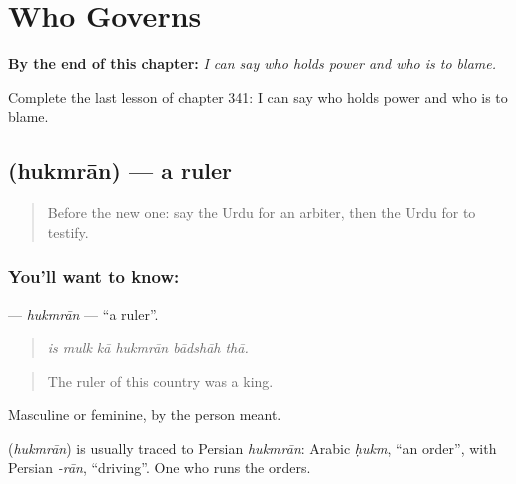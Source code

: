 
\chapter{Who Governs}
\label{ch:ur-who-governs}

\begin{chapteropening}
\textbf{By the end of this chapter:} \emph{I can say who holds power and who is to blame.}

Complete the last lesson of chapter 341: I can say who holds power and who is to blame.
\end{chapteropening}

\section[\texorpdfstring{\ur{حکمران} (hukmrān)}{حکمران (hukmrān)}]{ (hukmrān) — a ruler}

\label{lesson:UR-C341-hukmran}



\begin{quote}
Before the new one: say the Urdu for an arbiter, then the Urdu for to testify.
\end{quote}

\subsection*{You'll want to know: }
\textbf{} — \emph{hukmrān} — \textquotedblleft{}a ruler\textquotedblright{}.

\begin{quote}
     
\end{quote}

\begin{quote}
\emph{is mulk kā hukmrān bādshāh thā.}
\end{quote}

\begin{quote}
The ruler of this country was a king.
\end{quote}

Masculine or feminine, by the person meant.

\begin{cousinweb}
\textbf{} (\emph{hukmrān}) is usually traced to Persian \emph{hukmrān}: Arabic \emph{ḥukm}, \textquotedblleft{}an order\textquotedblright{}, with Persian \emph{-rān}, \textquotedblleft{}driving\textquotedblright{}. One who runs the orders.
\end{cousinweb}

